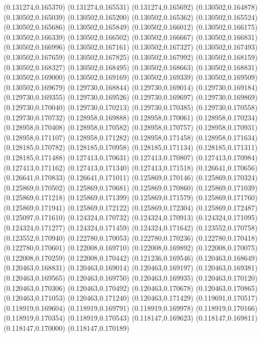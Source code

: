 (0.131274,0.165370)
(0.131274,0.165531)
(0.131274,0.165692)
(0.130502,0.164878)
(0.130502,0.165039)
(0.130502,0.165200)
(0.130502,0.165362)
(0.130502,0.165524)
(0.130502,0.165686)
(0.130502,0.165849)
(0.130502,0.166012)
(0.130502,0.166175)
(0.130502,0.166339)
(0.130502,0.166502)
(0.130502,0.166667)
(0.130502,0.166831)
(0.130502,0.166996)
(0.130502,0.167161)
(0.130502,0.167327)
(0.130502,0.167493)
(0.130502,0.167659)
(0.130502,0.167825)
(0.130502,0.167992)
(0.130502,0.168159)
(0.130502,0.168327)
(0.130502,0.168495)
(0.130502,0.168663)
(0.130502,0.168831)
(0.130502,0.169000)
(0.130502,0.169169)
(0.130502,0.169339)
(0.130502,0.169509)
(0.130502,0.169679)
(0.129730,0.168844)
(0.129730,0.169014)
(0.129730,0.169184)
(0.129730,0.169355)
(0.129730,0.169526)
(0.129730,0.169697)
(0.129730,0.169869)
(0.129730,0.170040)
(0.129730,0.170213)
(0.129730,0.170385)
(0.129730,0.170558)
(0.129730,0.170732)
(0.128958,0.169888)
(0.128958,0.170061)
(0.128958,0.170234)
(0.128958,0.170408)
(0.128958,0.170582)
(0.128958,0.170757)
(0.128958,0.170931)
(0.128958,0.171107)
(0.128958,0.171282)
(0.128958,0.171458)
(0.128958,0.171634)
(0.128185,0.170782)
(0.128185,0.170958)
(0.128185,0.171134)
(0.128185,0.171311)
(0.128185,0.171488)
(0.127413,0.170631)
(0.127413,0.170807)
(0.127413,0.170984)
(0.127413,0.171162)
(0.127413,0.171340)
(0.127413,0.171518)
(0.126641,0.170656)
(0.126641,0.170833)
(0.126641,0.171011)
(0.125869,0.170146)
(0.125869,0.170324)
(0.125869,0.170502)
(0.125869,0.170681)
(0.125869,0.170860)
(0.125869,0.171039)
(0.125869,0.171218)
(0.125869,0.171399)
(0.125869,0.171579)
(0.125869,0.171760)
(0.125869,0.171941)
(0.125869,0.172122)
(0.125869,0.172304)
(0.125869,0.172487)
(0.125097,0.171610)
(0.124324,0.170732)
(0.124324,0.170913)
(0.124324,0.171095)
(0.124324,0.171277)
(0.124324,0.171459)
(0.124324,0.171642)
(0.123552,0.170758)
(0.123552,0.170940)
(0.122780,0.170053)
(0.122780,0.170236)
(0.122780,0.170418)
(0.122780,0.170601)
(0.122008,0.169710)
(0.122008,0.169892)
(0.122008,0.170075)
(0.122008,0.170259)
(0.122008,0.170442)
(0.121236,0.169546)
(0.120463,0.168649)
(0.120463,0.168831)
(0.120463,0.169014)
(0.120463,0.169197)
(0.120463,0.169381)
(0.120463,0.169565)
(0.120463,0.169750)
(0.120463,0.169935)
(0.120463,0.170120)
(0.120463,0.170306)
(0.120463,0.170492)
(0.120463,0.170678)
(0.120463,0.170865)
(0.120463,0.171053)
(0.120463,0.171240)
(0.120463,0.171429)
(0.119691,0.170517)
(0.118919,0.169604)
(0.118919,0.169791)
(0.118919,0.169978)
(0.118919,0.170166)
(0.118919,0.170354)
(0.118919,0.170543)
(0.118147,0.169623)
(0.118147,0.169811)
(0.118147,0.170000)
(0.118147,0.170189)
